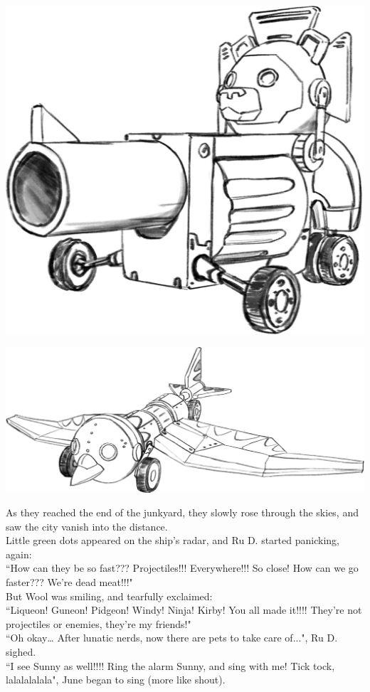 \begin{center}
    \includegraphics[height=.2\textheight]{Assets/wfbw_guneon}    
\end{center}
\begin{center}
    \includegraphics[height=.2\textheight]{Assets/wfbw_pigeon}    
\end{center}

As they reached the end of the junkyard, they slowly rose through the skies, and saw the city vanish into the distance.\\
Little green dots appeared on the ship's radar, and Ru D. started panicking, again:\\
``How can they be so fast??? Projectiles!!! Everywhere!!! So close! How can we go faster??? We’re dead meat!!!"\\
But Wool was smiling, and tearfully exclaimed:\\
``Liqueon! Guneon! Pidgeon! Windy! Ninja! Kirby! You all made it!!!! They’re not projectiles or enemies, they’re my friends!" \\
``Oh okay… After lunatic nerds, now there are pets to take care of...", Ru D. sighed.\\
``I see Sunny as well!!!! Ring the alarm Sunny, and sing with me! Tick tock, lalalalalala", June began to sing (more like shout).


